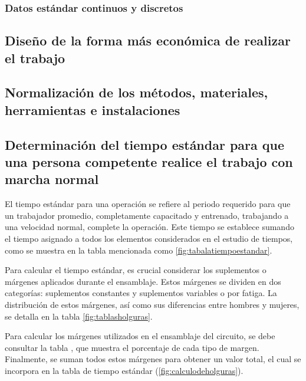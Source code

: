     \subsubsection{Datos estándar continuos y discretos}
    
    
    \subsection{Diseño de la forma más económica de realizar el trabajo}
    
    \subsection{Normalización de los métodos, materiales, herramientas e instalaciones}
    
    \subsection{Determinación del tiempo estándar para que una persona competente realice el trabajo con marcha normal}
    El tiempo estándar para una operación se refiere al periodo requerido para que un trabajador promedio, completamente capacitado y entrenado, trabajando a una velocidad normal, complete la operación. Este tiempo se establece sumando el tiempo asignado a todos los elementos considerados en el estudio de tiempos, como se muestra en la tabla mencionada como \ref{fig:tabalatiempoestandar}.
    
    Para calcular el tiempo estándar, es crucial considerar los suplementos o márgenes aplicados durante el ensamblaje. Estos márgenes se dividen en dos categorías: suplementos constantes y suplementos variables o por fatiga. La distribución de estos márgenes, así como sus diferencias entre hombres y mujeres, se detalla en la tabla \ref{fig:tablasholguras}.
    
    Para calcular los márgenes utilizados en el ensamblaje del circuito, se debe consultar la tabla , que muestra el porcentaje de cada tipo de margen. Finalmente, se suman todos estos márgenes para obtener un valor total, el cual se incorpora en la tabla de tiempo estándar (\ref{fig:calculodeholguras}).
    
